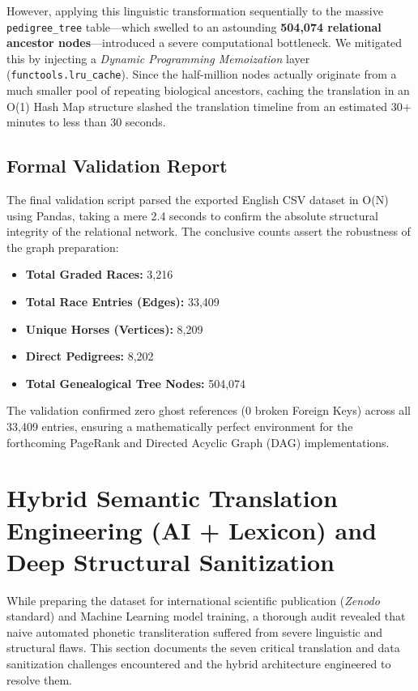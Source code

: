 \documentclass[12pt,a4paper]{article}
\begin{document}
However, applying this linguistic transformation sequentially to the massive \texttt{pedigree\_tree} table---which swelled to an astounding \textbf{504,074 relational ancestor nodes}---introduced a severe computational bottleneck. We mitigated this by injecting a \textit{Dynamic Programming Memoization} layer (\texttt{functools.lru\_cache}). Since the half-million nodes actually originate from a much smaller pool of repeating biological ancestors, caching the translation in an O(1) Hash Map structure slashed the translation timeline from an estimated 30+ minutes to less than 30 seconds.

\subsection{Formal Validation Report}
The final validation script parsed the exported English CSV dataset in O(N) using Pandas, taking a mere 2.4 seconds to confirm the absolute structural integrity of the relational network. The conclusive counts assert the robustness of the graph preparation:
\begin{itemize}
    \item \textbf{Total Graded Races:} 3,216
    \item \textbf{Total Race Entries (Edges):} 33,409
    \item \textbf{Unique Horses (Vertices):} 8,209
    \item \textbf{Direct Pedigrees:} 8,202
    \item \textbf{Total Genealogical Tree Nodes:} 504,074
\end{itemize}
The validation confirmed zero ghost references (0 broken Foreign Keys) across all 33,409 entries, ensuring a mathematically perfect environment for the forthcoming PageRank and Directed Acyclic Graph (DAG) implementations.



\section{Hybrid Semantic Translation Engineering (AI + Lexicon) and Deep Structural Sanitization}

While preparing the dataset for international scientific publication (\textit{Zenodo} standard) and Machine Learning model training, a thorough audit revealed that naive automated phonetic transliteration suffered from severe linguistic and structural flaws. This section documents the seven critical translation and data sanitization challenges encountered and the hybrid architecture engineered to resolve them.
\end{document}
